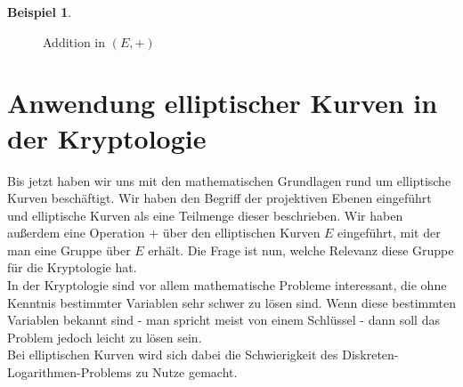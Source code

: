 \documentclass[hidelinks]{article}
\theoremstyle{plain}
\theoremstyle{definition}
\newtheorem{bsp}[thm]{Beispiel}
\theoremstyle{rem}
\begin{document}
\begin{sloppypar}
\begin{bsp}
\begin{figure}[H]
{}
        \caption{Addition in $(E, +)$}
    \end{figure}
\end{bsp}

\section{Anwendung elliptischer Kurven in der Kryptologie}
Bis jetzt haben wir uns mit den mathematischen Grundlagen rund um elliptische Kurven beschäftigt. Wir haben den Begriff der projektiven Ebenen eingeführt und elliptische Kurven als eine Teilmenge dieser beschrieben. 
Wir haben außerdem eine Operation $+$ über den elliptischen Kurven $E$ eingeführt, mit der man eine Gruppe über $E$ erhält.
Die Frage ist nun, welche Relevanz diese Gruppe für die Kryptologie hat. \\
In der Kryptologie sind vor allem mathematische Probleme interessant, die ohne Kenntnis bestimmter Variablen sehr schwer zu lösen sind. Wenn diese bestimmten Variablen bekannt sind - man spricht meist von einem Schlüssel - dann soll das Problem jedoch leicht zu lösen sein. \\
Bei elliptischen Kurven wird sich dabei die Schwierigkeit des Diskreten-Logarithmen-Problems zu Nutze gemacht.

\end{sloppypar}
\end{document}
